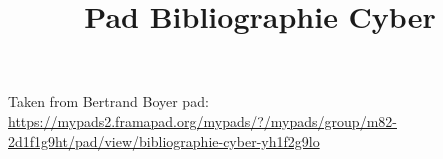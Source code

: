 \documentclass[12pt,a4paper]{article}
\author{}
\title{Pad Bibliographie Cyber}
\date{}
\begin{document}
\maketitle
\thispagestyle{empty}
Taken from Bertrand Boyer pad: \url{https://mypads2.framapad.org/mypads/?/mypads/group/m82-2d1f1g9ht/pad/view/bibliographie-cyber-yh1f2g9lo}
\nocite{*}
\renewcommand{\thepage}{}


\end{document}
